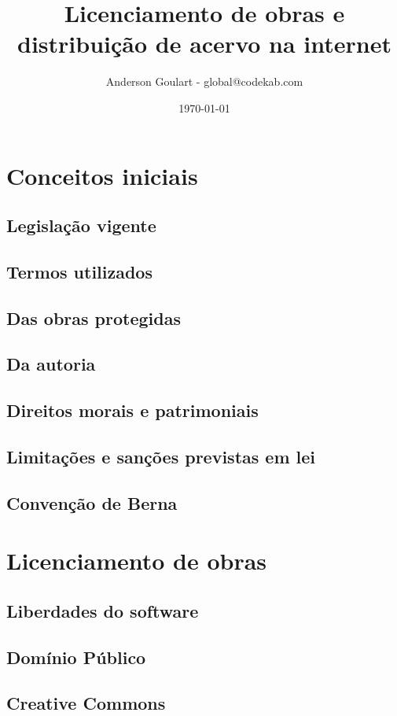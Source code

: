 \documentclass{beamer}
\title{Licenciamento de obras e distribuição de acervo na internet}
\author{Anderson Goulart - global@codekab.com}
\date{\today}
\begin{document}
\frame{\titlepage}

\section[Outline]{}
\frame{\tableofcontents}

\section{Conceitos iniciais}
\subsection{Legislação vigente}
\subsection{Termos utilizados}
\subsection{Das obras protegidas}
\subsection{Da autoria}
\subsection{Direitos morais e patrimoniais}
\subsection{Limitações e sanções previstas em lei}
\subsection{Convenção de Berna}

\section{Licenciamento de obras}
\subsection{Liberdades do software}
\subsection{Domínio Público}
\subsection{Creative Commons}
\end{document}
